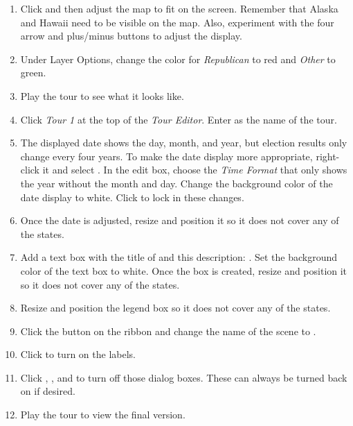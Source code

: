 \begin{enumbox}
\begin{enumerate}
		\item Click  and then adjust the map to fit on the screen. Remember that Alaska and Hawaii need to be visible on the map. Also, experiment with the four arrow and plus/minus buttons to adjust the display.
		\item Under Layer Options, change the color for \textit{Republican} to red and \textit{Other} to green.
		\item Play the tour to see what it looks like.
		\item Click \textit{Tour 1} at the top of the \textit{Tour Editor}. Enter  as the name of the tour. 
		\item The displayed date shows the day, month, and year, but election results only change every four years. To make the date display more appropriate, right-click it and select . In the edit box, choose the \textit{Time Format} that only shows the year without the month and day. Change the background color of the date display to white. Click  to lock in these changes. 
		\item Once the date is adjusted, resize and position it so it does not cover any of the states. 
		\item Add a text box with the title of  and this description: . Set the background color of the text box to white. Once the box is created, resize and position it so it does not cover any of the states.
		\item Resize and position the legend box so it does not cover any of the states.
		\item Click the  button on the ribbon and change the name of the scene to .
		\item Click  to turn on the labels.
		\item Click , , and  to turn off those dialog boxes. These can always be turned back on if desired.
		\item Play the tour to view the final version.
		

\end{enumerate}
\end{enumbox}
